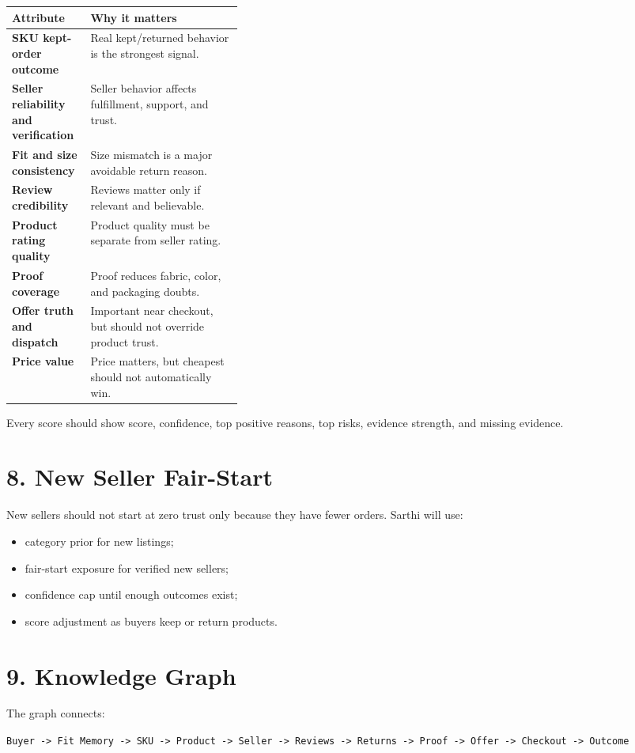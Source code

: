 \documentclass[11pt,a4paper,landscape]{article}
\newcommand{\tagline}[1]{\vspace{0.25em}\noindent\textcolor{sarthiMuted}{#1}\vspace{0.6em}}
\begin{document}
\begin{tabularx}{\linewidth}{>{\bfseries}p{0.34\linewidth}X}
\toprule
Attribute & Why it matters\\
\midrule
SKU kept-order outcome & Real kept/returned behavior is the strongest signal.\\
Seller reliability and verification & Seller behavior affects fulfillment, support, and trust.\\
Fit and size consistency & Size mismatch is a major avoidable return reason.\\
Review credibility & Reviews matter only if relevant and believable.\\
Product rating quality & Product quality must be separate from seller rating.\\
Proof coverage & Proof reduces fabric, color, and packaging doubts.\\
Offer truth and dispatch & Important near checkout, but should not override product trust.\\
Price value & Price matters, but cheapest should not automatically win.\\
\bottomrule
\end{tabularx}

\tagline{Every score should show score, confidence, top positive reasons, top risks, evidence strength, and missing evidence.}

\section{8. New Seller Fair-Start}
New sellers should not start at zero trust only because they have fewer orders. Sarthi will use:
\begin{itemize}
  \item category prior for new listings;
  \item fair-start exposure for verified new sellers;
  \item confidence cap until enough outcomes exist;
  \item score adjustment as buyers keep or return products.
\end{itemize}

\begin{center}
\end{center}

\section{9. Knowledge Graph}
The graph connects:
\begin{center}
\texttt{Buyer -> Fit Memory -> SKU -> Product -> Seller -> Reviews -> Returns -> Proof -> Offer -> Checkout -> Outcome}
\end{center}
\end{document}
